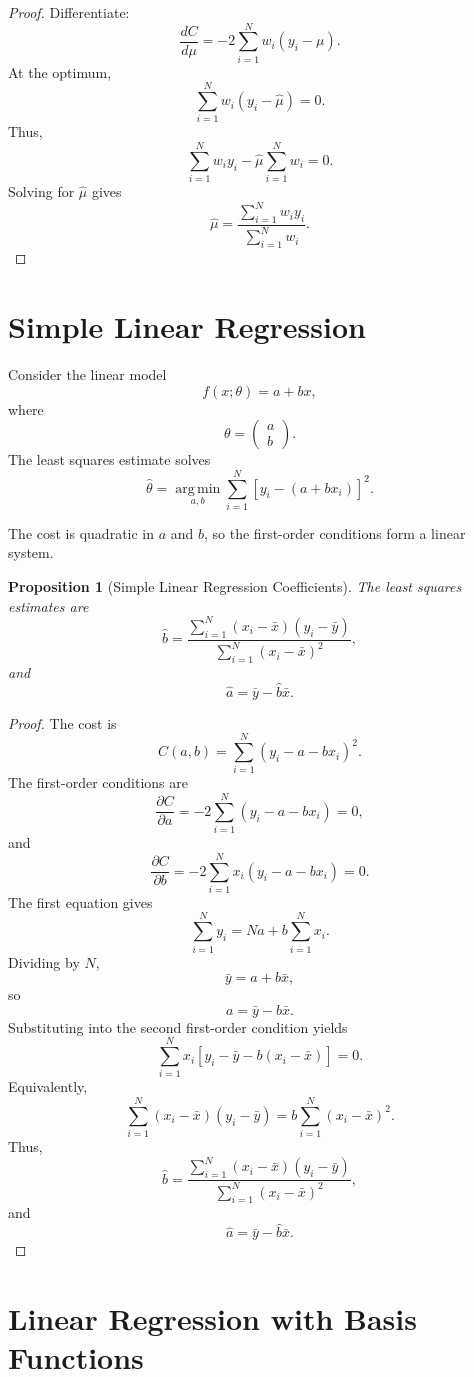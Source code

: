 \documentclass[12pt,oneside]{book}
\numberwithin{equation}{section}
\theoremstyle{definition}
\theoremstyle{plain}
\newtheorem{proposition}{Proposition}[section]
\theoremstyle{remark}
\newcommand{\argmin}{\operatorname*{arg\,min}}
\begin{document}
\begin{proof}
Differentiate:
\[
\frac{dC}{d\mu}
=
-2\sum_{i=1}^N w_i(y_i-\mu).
\]
At the optimum,
\[
\sum_{i=1}^N w_i(y_i-\hat{\mu})=0.
\]
Thus,
\[
\sum_{i=1}^N w_i y_i
-
\hat{\mu}\sum_{i=1}^N w_i
=
0.
\]
Solving for $\hat{\mu}$ gives
\[
\hat{\mu}
=
\frac{\sum_{i=1}^N w_i y_i}{\sum_{i=1}^N w_i}.
\]
\end{proof}

\section{Simple Linear Regression}

Consider the linear model
\[
f(x;\theta)=a+bx,
\]
where
\[
\theta=
\begin{pmatrix}
a\\
b
\end{pmatrix}.
\]
The least squares estimate solves
\[
\hat{\theta}
=
\argmin_{a,b}
\sum_{i=1}^N
\left[y_i-(a+bx_i)\right]^2.
\]

The cost is quadratic in $a$ and $b$, so the first-order conditions form a linear system.

\begin{proposition}[Simple Linear Regression Coefficients]
The least squares estimates are
\[
\hat{b}
=
\frac{\sum_{i=1}^N (x_i-\bar{x})(y_i-\bar{y})}
{\sum_{i=1}^N (x_i-\bar{x})^2},
\]
and
\[
\hat{a}
=
\bar{y}-\hat{b}\bar{x}.
\]
\end{proposition}

\begin{proof}
The cost is
\[
C(a,b)
=
\sum_{i=1}^N
(y_i-a-bx_i)^2.
\]
The first-order conditions are
\[
\frac{\partial C}{\partial a}
=
-2\sum_{i=1}^N (y_i-a-bx_i)
=
0,
\]
and
\[
\frac{\partial C}{\partial b}
=
-2\sum_{i=1}^N x_i(y_i-a-bx_i)
=
0.
\]
The first equation gives
\[
\sum_{i=1}^N y_i
=
Na+b\sum_{i=1}^N x_i.
\]
Dividing by $N$,
\[
\bar{y}=a+b\bar{x},
\]
so
\[
a=\bar{y}-b\bar{x}.
\]
Substituting into the second first-order condition yields
\[
\sum_{i=1}^N x_i\left[y_i-\bar{y}-b(x_i-\bar{x})\right]=0.
\]
Equivalently,
\[
\sum_{i=1}^N (x_i-\bar{x})(y_i-\bar{y})
=
b\sum_{i=1}^N (x_i-\bar{x})^2.
\]
Thus,
\[
\hat{b}
=
\frac{\sum_{i=1}^N (x_i-\bar{x})(y_i-\bar{y})}
{\sum_{i=1}^N (x_i-\bar{x})^2},
\]
and
\[
\hat{a}=\bar{y}-\hat{b}\bar{x}.
\]
\end{proof}

\section{Linear Regression with Basis Functions}
\end{document}

